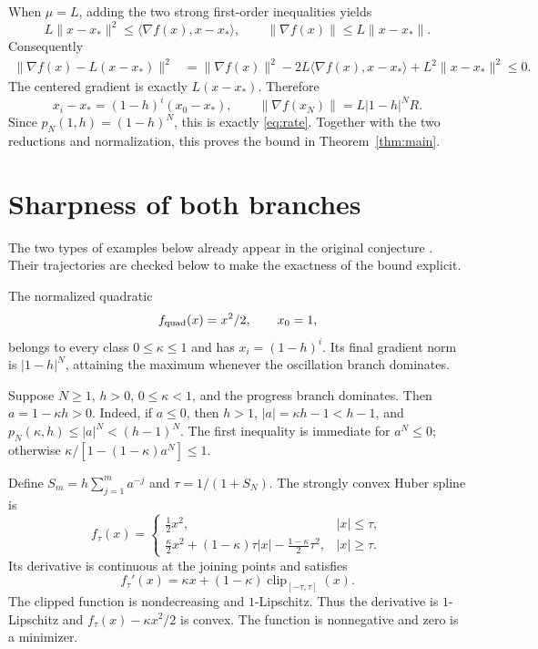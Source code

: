 \documentclass[11pt]{article}
\numberwithin{equation}{section}
\theoremstyle{remark}
\newcommand{\ip}[2]{\langle #1,#2\rangle}
\newcommand{\norm}[1]{\lVert #1\rVert}
\newcommand{\grad}{\nabla}
\begin{document}
When $\mu=L$, adding the two strong first-order inequalities yields
\[
L\norm{x-x_*}^2\leq\ip{\grad f(x)}{x-x_*},
\qquad \norm{\grad f(x)}\leq L\norm{x-x_*}.
\]
Consequently
\begin{align*}
\norm{\grad f(x)-L(x-x_*)}^2
&=\norm{\grad f(x)}^2-2L\ip{\grad f(x)}{x-x_*}
  +L^2\norm{x-x_*}^2\leq0.
\end{align*}
The centered gradient is exactly $L(x-x_*)$. Therefore
\[
x_i-x_*=(1-h)^i(x_0-x_*),\qquad
\norm{\grad f(x_N)}=L|1-h|^N R.
\]
Since $p_N(1,h)=(1-h)^N$, this is exactly \eqref{eq:rate}.
Together with the two reductions and normalization, this proves the
bound in Theorem~\ref{thm:main}.



\section{Sharpness of both branches}

The two types of examples below already appear in the original
conjecture \cite{THG17}. Their trajectories are checked below to make the
exactness of the bound explicit.

The normalized quadratic
\begin{equation}
f_{\rm quad}(x)=x^2/2,\qquad x_0=1,
\label{eq:quadratic-example}
\end{equation}
belongs to every class $0\leq\kappa\leq1$ and has
$x_i=(1-h)^i$. Its final gradient norm is $|1-h|^N$, attaining the
maximum whenever the oscillation branch dominates.

Suppose $N\geq1$, $h>0$, $0\leq\kappa<1$, and the progress branch
dominates. Then $a=1-\kappa h>0$. Indeed, if $a\leq0$, then $h>1$,
$|a|=\kappa h-1<h-1$, and
$p_N(\kappa,h)\leq|a|^N<(h-1)^N$. The first inequality is immediate
for $a^N\leq0$; otherwise
$\kappa/[1-(1-\kappa)a^N]\leq1$.

Define $S_m=h\sum_{j=1}^m a^{-j}$ and $\tau=1/(1+S_N)$.
The strongly convex Huber spline is
\begin{equation}
f_\tau(x)=
\begin{cases}
\frac12x^2,&|x|\leq\tau,\\[3pt]
\frac\kappa2x^2+(1-\kappa)\tau|x|
 -\frac{1-\kappa}{2}\tau^2,&|x|\geq\tau.
\end{cases}
\label{eq:huber-example}
\end{equation}
Its derivative is continuous at the joining points and satisfies
\begin{equation}
f_\tau'(x)=\kappa x+
 (1-\kappa)\operatorname{clip}_{[-\tau,\tau]}(x).
\label{eq:clipped-gradient}
\end{equation}
The clipped function is nondecreasing and $1$-Lipschitz. Thus the
derivative is $1$-Lipschitz and
$f_\tau(x)-\kappa x^2/2$ is convex. The function is nonnegative and
zero is a minimizer.
\end{document}
